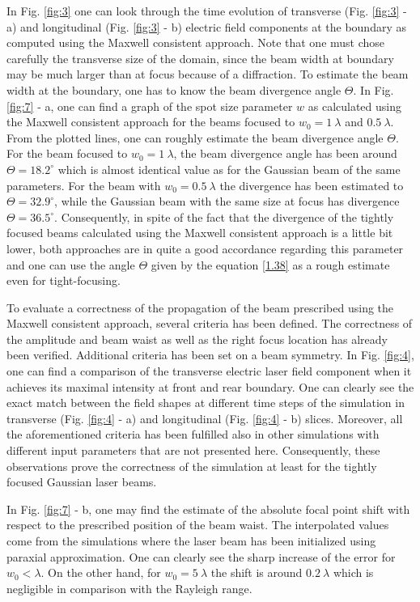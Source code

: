 In Fig. \ref{fig:3} one can look through the time evolution of transverse (Fig. \ref{fig:3} - a) and longitudinal (Fig. \ref{fig:3} - b) electric field components at the boundary as computed using the Maxwell consistent approach. Note that one must chose carefully the transverse size of the domain, since the beam width at boundary may be much larger than at focus because of a diffraction. To estimate the beam width at the boundary, one has to know the beam divergence angle $ \Theta $. In Fig. \ref{fig:7} - a, one can find a graph of the spot size parameter $ w $ as calculated using the Maxwell consistent approach for the beams focused to $ w_0 = 1 \ \lambda $ and $ 0.5 \ \lambda $. From the plotted lines, one can roughly estimate the beam divergence angle $ \Theta $. For the beam focused to $ w_0 = 1 \ \lambda $, the beam divergence angle has been around $ \Theta = 18.2 ^{\circ} $ which is almost identical value as for the Gaussian beam of the same parameters. For the beam with $ w_0 = 0.5 \ \lambda $ the divergence has been estimated to $ \Theta = 32.9 ^{\circ} $, while the Gaussian beam with the same size at focus has divergence $ \Theta = 36.5 ^{\circ} $. Consequently, in spite of the fact that the divergence of the tightly focused beams calculated using the Maxwell consistent approach is a little bit lower, both approaches are in quite a good accordance regarding this parameter and one can use the angle $ \Theta $ given by the equation \ref{1.38} as a rough estimate even for tight-focusing.

To evaluate a correctness of the propagation of the beam prescribed using the Maxwell consistent approach, several criteria has been defined. The correctness of the amplitude and beam waist as well as the right focus location has already been verified. Additional criteria has been set on a beam symmetry. In Fig. \ref{fig:4}, one can find a comparison of the transverse electric laser field component when it achieves its maximal intensity at front and rear boundary. One can clearly see the exact match between the field shapes at different time steps of the simulation in transverse (Fig. \ref{fig:4} - a) and longitudinal (Fig. \ref{fig:4} - b) slices. Moreover, all the aforementioned criteria has been fulfilled also in other simulations with different input parameters that are not presented here. Consequently, these observations prove the correctness of the simulation at least for the tightly focused Gaussian laser beams.

In Fig. \ref{fig:7} - b, one may find the estimate of the absolute focal point shift with respect to the prescribed position of the beam waist. The interpolated values come from the simulations where the laser beam has been initialized using paraxial approximation. One can clearly see the sharp increase of the error for $ w_0 < \lambda $. On the other hand, for $ w_0 = 5 \ \lambda $ the shift is around $ 0.2 \ \lambda $ which is negligible in comparison with the Rayleigh range.

